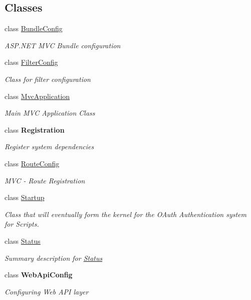 \subsection*{Classes}
\begin{DoxyCompactItemize}
\item 
class \hyperlink{class_open_1_1_g_i_1_1hypermart_1_1_bundle_config}{Bundle\+Config}
\begin{DoxyCompactList}\small\item\em A\+S\+P.\+N\+ET M\+VC Bundle configuration \end{DoxyCompactList}\item 
class \hyperlink{class_open_1_1_g_i_1_1hypermart_1_1_filter_config}{Filter\+Config}
\begin{DoxyCompactList}\small\item\em Class for filter configuration \end{DoxyCompactList}\item 
class \hyperlink{class_open_1_1_g_i_1_1hypermart_1_1_mvc_application}{Mvc\+Application}
\begin{DoxyCompactList}\small\item\em Main M\+VC Application Class \end{DoxyCompactList}\item 
class {\bfseries Registration}
\begin{DoxyCompactList}\small\item\em Register system dependencies \end{DoxyCompactList}\item 
class \hyperlink{class_open_1_1_g_i_1_1hypermart_1_1_route_config}{Route\+Config}
\begin{DoxyCompactList}\small\item\em M\+VC -\/ Route Registration \end{DoxyCompactList}\item 
class \hyperlink{class_open_1_1_g_i_1_1hypermart_1_1_startup}{Startup}
\begin{DoxyCompactList}\small\item\em Class that will eventually form the kernel for the O\+Auth Authentication system for Scripts. \end{DoxyCompactList}\item 
class \hyperlink{class_open_1_1_g_i_1_1hypermart_1_1_status}{Status}
\begin{DoxyCompactList}\small\item\em Summary description for \hyperlink{class_open_1_1_g_i_1_1hypermart_1_1_status}{Status} \end{DoxyCompactList}\item 
class {\bfseries Web\+Api\+Config}
\begin{DoxyCompactList}\small\item\em Configuring Web A\+PI layer \end{DoxyCompactList}\end{DoxyCompactItemize}
